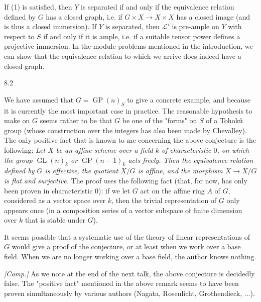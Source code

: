   If (1) is satisfied, then \(Y\) is separated if and only if the equivalence relation defined by \(G\) has a closed graph, i.e. if \(G\times  X\to  X\times  X\) has a closed image (and is thus a closed immersion).
  If \(Y\) is separated, then \(\mathscr {L}'\) is pre-ample on \(Y\) with respect to \(S\) if and only if it is ample, i.e. if a suitable tensor power defines a projective immersion.
  In the module problems mentioned in the introduction, we can show that the equivalence relation to which we arrive does indeed have a closed graph.\begin{remarks}{8.2}\label{fga3.iii-8-remarks-8.2}\skipsinglepar\par{}We have assumed that \(G=\operatorname {GP}(n)_S\) to give a concrete example, and because it is currently the most important case in practice.
    The reasonable hypothesis to make on \(G\) seems rather to be that \(G\) be one of the "forms" on \(S\) of a Tohokû group (whose construction over the integers has also been made by Chevalley).
    The only positive fact that is known to me concerning the above conjecture is the following:
    \emph{Let \(X\) be an affine scheme over a field \(k\) of characteristic \(0\), on which the group \(\operatorname {GL}(n)_k\) or \(\operatorname {GP}(n-1)_k\) acts freely. Then the equivalence relation defined by \(G\) is effective, the quotient \(X/G\) is affine, and the morphism \(X\to  X/G\) is flat and surjective.}
    The proof uses the following fact (that, for now, has only been proven in characteristic \(0\)):
    if we let \(G\) act on the affine ring \(A\) of \(G\), considered as a vector space over \(k\), then the trivial representation of \(G\) only appears once (in a composition series of a vector subspace of finite dimension over \(k\) that is stable under \(G\)).
    
    It seems possible that a systematic use of the theory of linear representations of \(G\) would give a proof of the conjecture, or at least when we work over a base field.
    When we are no longer working over a base field, the author knows nothing.\end{remarks}\begin{remark}{}\label{fga3.iii-8-remark-ii}\skipsinglepar\par{}\emph{[Comp.]}
    As we note at the end of the next talk, the above conjecture is decidedly false.
    The "positive fact" mentioned in the above remark seems to have been proven simultaneously by various authors (Nagata, Rosenlicht, Grothendieck, ...).\end{remark}